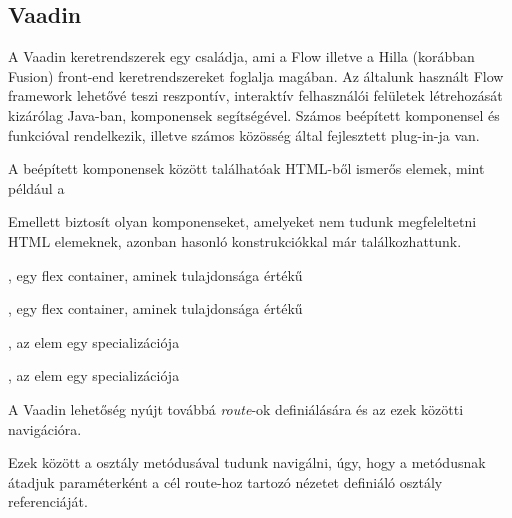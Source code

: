 \subsection{Vaadin}

A Vaadin keretrendszerek egy családja, ami a Flow illetve a Hilla (korábban Fusion) front-end keretrendszereket foglalja magában. Az általunk használt Flow framework lehetővé teszi reszpontív, interaktív felhasználói felületek létrehozását kizárólag Java-ban, komponensek segítségével. Számos beépített komponensel és funkcióval rendelkezik, illetve számos közösség által fejlesztett plug-in-ja van. \par

A beépített komponensek között találhatóak HTML-ből ismerős elemek, mint például a

\begin{listing}
	\item {}
	\item {}
	\item {}
	\item {}
	\item {}
	\item {}
\end{listing}

Emellett biztosít olyan komponenseket, amelyeket nem tudunk megfeleltetni HTML elemeknek, azonban hasonló konstrukciókkal már találkozhattunk.

\begin{listing}
	\item {}, egy flex container, aminek  tulajdonsága  értékű 
	\item {}, egy flex container, aminek  tulajdonsága  értékű 
	\item {}, az  elem egy specializációja
	\item {}, az  elem egy specializációja
\end{listing}

A Vaadin lehetőség nyújt továbbá \emph{route}-ok definiálására és az ezek közötti navigációra.


Ezek között a  osztály  metódusával tudunk navigálni, úgy, hogy a metódusnak átadjuk paraméterként a cél route-hoz tartozó nézetet definiáló osztály referenciáját.

